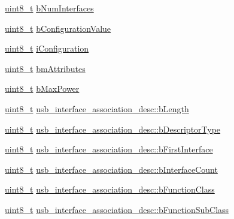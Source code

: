 \begin{DoxyCompactItemize}
\item 
\hyperlink{stdint_8h_aba7bc1797add20fe3efdf37ced1182c5}{uint8\-\_\-t} \hyperlink{group___p_i_o_s___u_s_b___d_e_f_s_ga1ad144333e75b0d867e72f8a337cd510}{b\-Num\-Interfaces}
\item 
\hyperlink{stdint_8h_aba7bc1797add20fe3efdf37ced1182c5}{uint8\-\_\-t} \hyperlink{group___p_i_o_s___u_s_b___d_e_f_s_gaecb9ae30bca0b044d2941120f21c2b29}{b\-Configuration\-Value}
\item 
\hyperlink{stdint_8h_aba7bc1797add20fe3efdf37ced1182c5}{uint8\-\_\-t} \hyperlink{group___p_i_o_s___u_s_b___d_e_f_s_ga5ad4440b4eb1935d66b154d274f8a272}{i\-Configuration}
\item 
\hyperlink{stdint_8h_aba7bc1797add20fe3efdf37ced1182c5}{uint8\-\_\-t} \hyperlink{group___p_i_o_s___u_s_b___d_e_f_s_gae7c63b4cda39953db5710012a5d91c6f}{bm\-Attributes}
\item 
\hyperlink{stdint_8h_aba7bc1797add20fe3efdf37ced1182c5}{uint8\-\_\-t} \hyperlink{group___p_i_o_s___u_s_b___d_e_f_s_gad3ac74420252d7a6a03e1e9d7b481f9b}{b\-Max\-Power}
\item 
\hyperlink{stdint_8h_aba7bc1797add20fe3efdf37ced1182c5}{uint8\-\_\-t} \hyperlink{group___p_i_o_s___u_s_b___d_e_f_s_gac2df51916afa2daee6b2cd5084aa9b65}{usb\-\_\-interface\-\_\-association\-\_\-desc\-::b\-Length}
\item 
\hyperlink{stdint_8h_aba7bc1797add20fe3efdf37ced1182c5}{uint8\-\_\-t} \hyperlink{group___p_i_o_s___u_s_b___d_e_f_s_gab9d86ba47450d51a49e1b25684970e4e}{usb\-\_\-interface\-\_\-association\-\_\-desc\-::b\-Descriptor\-Type}
\item 
\hyperlink{stdint_8h_aba7bc1797add20fe3efdf37ced1182c5}{uint8\-\_\-t} \hyperlink{group___p_i_o_s___u_s_b___d_e_f_s_ga5301f325d65bec1bea2bf370c1a753ea}{usb\-\_\-interface\-\_\-association\-\_\-desc\-::b\-First\-Interface}
\item 
\hyperlink{stdint_8h_aba7bc1797add20fe3efdf37ced1182c5}{uint8\-\_\-t} \hyperlink{group___p_i_o_s___u_s_b___d_e_f_s_gae55742862ae442a25fc810abbfae15ef}{usb\-\_\-interface\-\_\-association\-\_\-desc\-::b\-Interface\-Count}
\item 
\hyperlink{stdint_8h_aba7bc1797add20fe3efdf37ced1182c5}{uint8\-\_\-t} \hyperlink{group___p_i_o_s___u_s_b___d_e_f_s_ga29a82765e766cecea56a883db16dd78e}{usb\-\_\-interface\-\_\-association\-\_\-desc\-::b\-Function\-Class}
\item 
\hyperlink{stdint_8h_aba7bc1797add20fe3efdf37ced1182c5}{uint8\-\_\-t} \hyperlink{group___p_i_o_s___u_s_b___d_e_f_s_ga8bd62c9bba867dfd7abbba86be72499f}{usb\-\_\-interface\-\_\-association\-\_\-desc\-::b\-Function\-Sub\-Class}

\end{DoxyCompactItemize}

